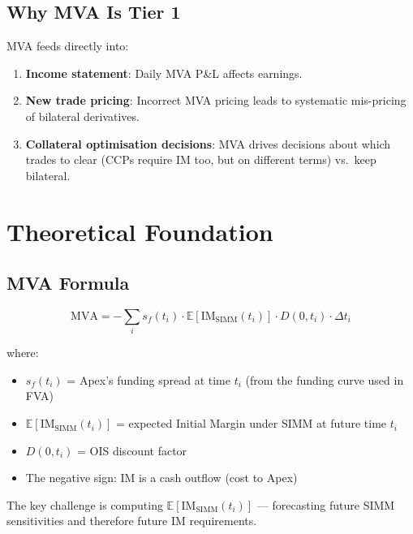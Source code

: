 \documentclass[11pt,a4paper]{article}
\begin{document}
\subsection{Why MVA Is Tier 1}

MVA feeds directly into:
\begin{enumerate}[leftmargin=*]
  \item \textbf{Income statement}: Daily MVA P\&L affects earnings.
  \item \textbf{New trade pricing}: Incorrect MVA pricing leads to systematic mis-pricing of bilateral derivatives.
  \item \textbf{Collateral optimisation decisions}: MVA drives decisions about which trades to clear (CCPs require IM too, but on different terms) vs.\ keep bilateral.
\end{enumerate}

\section{Theoretical Foundation}

\subsection{MVA Formula}

\begin{equation}
\mathrm{MVA} = -\sum_i s_f(t_i)\cdot\mathbb{E}\!\left[\mathrm{IM}_{\mathrm{SIMM}}(t_i)\right]\cdot D(0,t_i)\cdot\Delta t_i
\tag{3}
\end{equation}

where:
\begin{itemize}[leftmargin=*]
  \item $s_f(t_i)$ = Apex's funding spread at time $t_i$ (from the funding curve used in FVA)
  \item $\mathbb{E}[\mathrm{IM}_{\mathrm{SIMM}}(t_i)]$ = expected Initial Margin under SIMM at future time $t_i$
  \item $D(0,t_i)$ = OIS discount factor
  \item The negative sign: IM is a cash outflow (cost to Apex)
\end{itemize}

The key challenge is computing $\mathbb{E}[\mathrm{IM}_{\mathrm{SIMM}}(t_i)]$ --- forecasting
future SIMM sensitivities and therefore future IM requirements.
\end{document}
